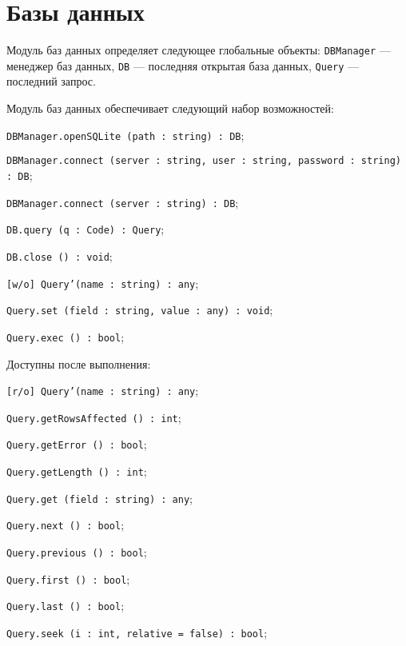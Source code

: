 \section{Базы данных}

Модуль баз данных определяет следующее глобальные объекты: \texttt{DBManager} — менеджер баз данных, \texttt{DB} — последняя открытая база данных, \texttt{Query} — последний запрос.

Модуль баз данных обеспечивает следующий набор возможностей:
\begin{icItems}
    \item \texttt{DBManager.openSQLite (path : string) : DB};
    \item \texttt{DBManager.connect (server : string, user : string, password : string) : DB};
    \item \texttt{DBManager.connect (server : string) : DB};
	\item \texttt{DB.query (q : Code) : Query};
	\item \texttt{DB.close () : void};
	\item \texttt{[w/o] Query'(name : string) : any};
	\item \texttt{Query.set (field : string, value : any) : void};
	\item \texttt{Query.exec () : bool};
	\item Доступны после выполнения:
	\begin{icItems}
	    \item \texttt{[r/o] Query'(name : string) : any};
		\item \texttt{Query.getRowsAffected () : int};
		\item \texttt{Query.getError () : bool};
		\item \texttt{Query.getLength () : int};
		\item \texttt{Query.get (field : string) : any};
		\item \texttt{Query.next () : bool};
		\item \texttt{Query.previous () : bool};
		\item \texttt{Query.first () : bool};
		\item \texttt{Query.last () : bool};
		\item \texttt{Query.seek (i : int, relative = false) : bool};
	\end{icItems}
\end{icItems}

